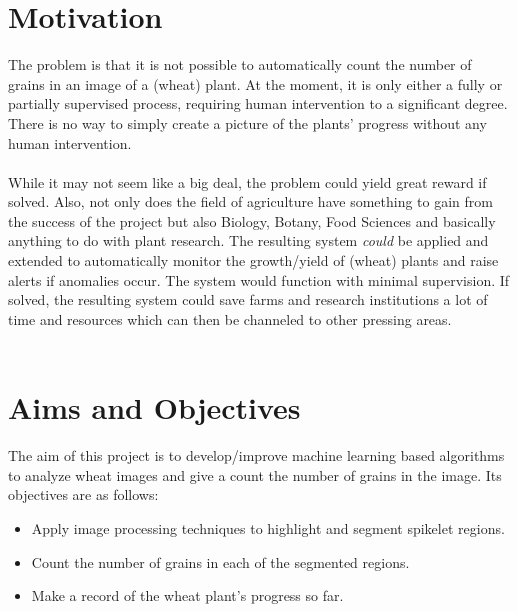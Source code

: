 \section{Motivation}
The problem is that it is not possible to automatically count the number of grains in an image of a (wheat) plant. At the moment, it is only either a fully or partially supervised process, requiring human intervention to a significant degree. There is no way to simply create a picture of the plants' progress without any human intervention.\\ \\
%
While it may not seem like a big deal, the problem could yield great reward if solved. Also, not only does the field of agriculture have something to gain from the success of the project but also Biology, Botany, Food Sciences and basically anything to do with plant research. The resulting system \textit{could} be applied and extended to automatically monitor the growth/yield of (wheat) plants and raise alerts if anomalies occur. The system would function with minimal supervision. If solved, the resulting system could save farms and research institutions a lot of time and resources which can then be channeled to other pressing areas.\\ \\


\bigskip

\goodbreak

\section{Aims and Objectives}
The aim of this project is to develop/improve machine learning based algorithms to analyze wheat images and give a count the number of grains in the image. Its objectives are as follows:
\begin{itemize}
\item Apply image processing techniques to highlight and segment spikelet regions.
\item Count the number of grains in each of the segmented regions.
\item Make a record of the wheat plant's progress so far.
\end{itemize}



